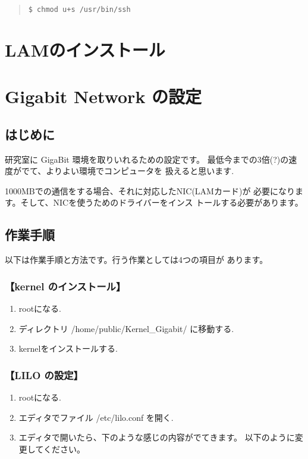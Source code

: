 \documentclass[a4paper,titlepage]{jreport}
\begin{document}
\begin{quote}
\begin{screen}
\begin{verbatim}
$ chmod u+s /usr/bin/ssh
\end{verbatim}
\end{screen}
\end{quote}

\section{LAMのインストール}

\section{Gigabit Network の設定}

\subsection{はじめに}
研究室に GigaBit 環境を取りいれるための設定です。
最低今までの3倍(?)の速度がでて、よりよい環境でコンピュータを
扱えると思います.

1000MBでの通信をする場合、それに対応したNIC(LAMカード)が
必要になります。そして、NICを使うためのドライバーをインス
トールする必要があります。

\subsection{作業手順}

以下は作業手順と方法です。行う作業としては4つの項目が
あります。

\subsubsection{【kernel のインストール】}

\begin{enumerate}
\item rootになる.
\item ディレクトリ /home/public/Kernel\_Gigabit/ に移動する.
\item kernelをインストールする.
\end{enumerate}

\subsubsection{【LILO の設定】}

\begin{enumerate}
\item rootになる.
\item エディタでファイル /etc/lilo.conf を開く.
\item エディタで開いたら、下のような感じの内容がでてきます。
        以下のように変更してください。
\end{enumerate}
\end{document}
